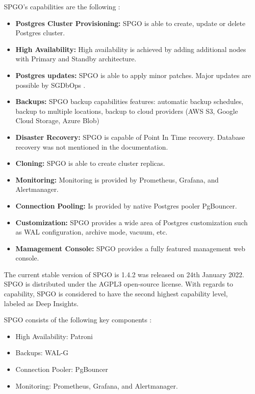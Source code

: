 SPGO’s capabilities are the following \cite{OnGres}:
\begin{itemize}
  \item \textbf{Postgres Cluster Provisioning:} SPGO is able to create, update or delete Postgres cluster.
  \item \textbf{High Availability:} High availability is achieved by adding additional nodes with Primary and Standby architecture.
  \item \textbf{Postgres updates:} SPGO is able to apply minor patches. Major updates are possible by SGDbOps \cite{SPGODocuMajorUpdates}.
  \item \textbf{Backups:} SPGO backup capabilities features: automatic backup schedules, backup to multiple locations, backup to cloud providers (AWS S3, Google Cloud Storage, Azure Blob)
  \item \textbf{Disaster Recovery:} SPGO is capable of Point In Time recovery. Database recovery was not mentioned in the documentation.
  \item \textbf{Cloning:} SPGO is able to create cluster replicas.
  \item \textbf{Monitoring:} Monitoring is provided by Prometheus, Grafana, and Alertmanager.
  \item \textbf{Connection Pooling:} Is provided by native Postgres pooler PgBouncer.
  \item \textbf{Customization:} SPGO provides a wide area of Postgres customization such as WAL configuration, archive mode, vacuum, etc. \cite{SPGODocuCustomization}
  \item \textbf{Mamagement Console:} SPGO provides a fully featured management web console.

\end{itemize}

The current stable version of SPGO is 1.4.2 was released on 24th January 2022. \cite{SPGOgitlabChangelog} SPGO is distributed under the AGPL3 open-source license. \cite{SPGODocuLicence}
With regards to capability, SPGO is considered to have the second highest capability level, labeled as Deep Insights. \cite{OperatorHubStackgres}

SPGO consists of the following key components \cite{PostgresOnKubernetes}:
\begin{itemize}
  \item High Availability: Patroni
  \item Backups: WAL-G
  \item Connection Pooler: PgBouncer
  \item Monitoring: Prometheus, Grafana, and Alertmanager.
\end{itemize}


